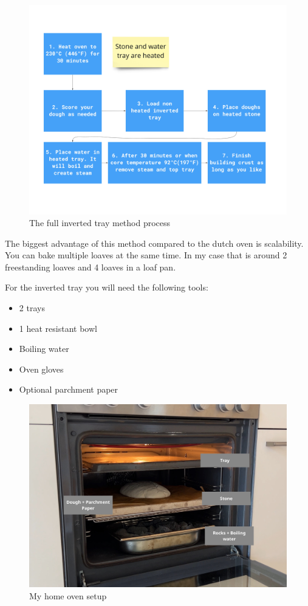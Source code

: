 \begin{figure}[!htb]
  \includegraphics[width=\textwidth]{baking-process-overview.jpg}
  \caption{The full inverted tray method process}
\end{figure}


The biggest advantage of this method compared to the
dutch oven is scalability. You can bake multiple loaves
at the same time. In my case that is around 2 freestanding
loaves and 4 loaves in a loaf pan.

For the inverted tray you will need the following tools:
\begin{itemize}
\item 2 trays
\item 1 heat resistant bowl
\item Boiling water
\item Oven gloves
\item Optional parchment paper
\end{itemize}

\begin{figure}[!htb]
  \includegraphics[width=\textwidth]{baking-example.jpg}
  \caption{My home oven setup}
\end{figure}

